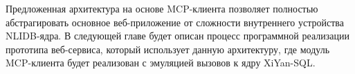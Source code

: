 Предложенная архитектура на основе MCP-клиента позволяет полностью абстрагировать
основное веб-приложение от сложности внутреннего устройства NLIDB-ядра. В следующей главе
будет описан процесс программной реализации прототипа веб-сервиса,
который использует данную архитектуру, где модуль MCP-клиента будет реализован с эмуляцией
вызовов к ядру XiYan-SQL.